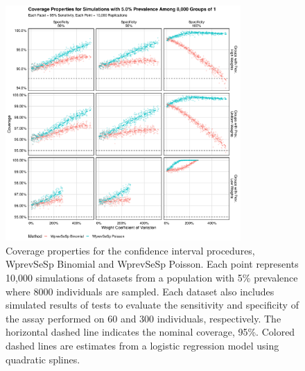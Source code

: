 \begin{figure}
\centering
\includegraphics[width=0.8\textwidth]{imperfect_coverage_8000_groups_0_05_prev}
\caption{Coverage properties for the confidence interval procedures, WprevSeSp Binomial and WprevSeSp Poisson.
Each point represents 10,000 simulations of datasets from a population with 5\% prevalence where 8000 individuals are sampled.
Each dataset also includes simulated results of tests to evaluate the sensitivity and specificity of the assay performed on 60 and 300 individuals, respectively.
The horizontal dashed line indicates the nominal coverage, 95\%.
Colored dashed lines are estimates from a logistic regression model using quadratic splines.}
\label{ch_3:fig:imperfect_coverage_8000_groups_0_05_prev}
\end{figure}

